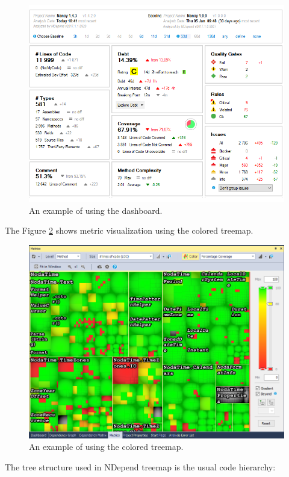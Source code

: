 \begin{figure}[ht]
	\centering
	\includegraphics[width=\textwidth]{figures/dash.png}
	\caption{An example of using the dashboard.}
	\label{fig:dash}
\end{figure}

The Figure \ref{fig:tree} shows metric visualization using the colored treemap.

\begin{figure}[ht]
	\centering
	\includegraphics[width=\textwidth]{figures/tree.png}
	\caption{An example of using the colored treemap.}
	\label{fig:tree}
\end{figure}

The tree structure used in NDepend treemap is the usual code hierarchy: 

